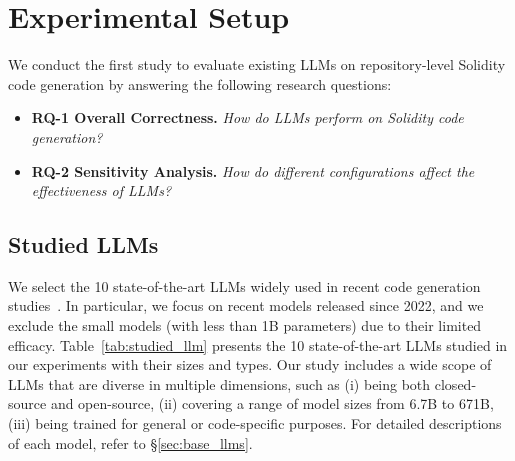 \section{Experimental Setup}


We conduct the first study to evaluate existing LLMs on repository-level Solidity code generation by answering the following research questions:

\begin{itemize}[leftmargin=*]
\item \textbf{RQ-1 Overall Correctness.} {\em How do LLMs perform on Solidity code generation?}

\item \textbf{RQ-2 Sensitivity Analysis.} {\em How do different configurations affect the effectiveness of LLMs?}

\end{itemize}


\subsection{Studied LLMs}

We select the 10 state-of-the-art LLMs widely used in recent code generation studies~\cite{khan2023xcodeeval,yan2023codescope,A3CodGen,yu2024codereval,li2024deveval}. 
In particular, we focus on recent models released since 2022, and we exclude the small models (with less than 1B parameters) due to their limited efficacy. 
Table~\ref{tab:studied_llm} presents the 10 state-of-the-art LLMs studied in our experiments with their sizes and types. 
Our study includes a wide scope of LLMs that are diverse in multiple dimensions, such as (i) being both closed-source and open-source, (ii) covering a range of model sizes from 6.7B to 671B, (iii) being trained for general or code-specific purposes. 
For detailed descriptions of each model, refer to \S\ref{sec:base_llms}.


